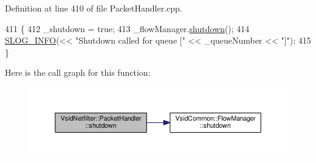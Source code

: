 Definition at line 410 of file Packet\-Handler.\-cpp.


\begin{DoxyCode}
411 \{
412     \_shutdown = \textcolor{keyword}{true};
413     \_flowManager.\hyperlink{class_vsid_common_1_1_flow_manager_a631e775596b97c611f2fb3ee7e207295}{shutdown}();
414     \hyperlink{_logger_8h_a119c1c29ba35a8db38e2358e41167282}{SLOG\_INFO}(<< \textcolor{stringliteral}{"Shutdown called for queue ["} << \_queueNumber << \textcolor{stringliteral}{"]"});
415 \}
\end{DoxyCode}


Here is the call graph for this function\-:
\nopagebreak
\begin{figure}[H]
\begin{center}
\leavevmode
\includegraphics[width=350pt]{class_vsid_netfilter_1_1_packet_handler_acba4a3d934d515a3a867c008b3c909a7_cgraph}
\end{center}
\end{figure}


